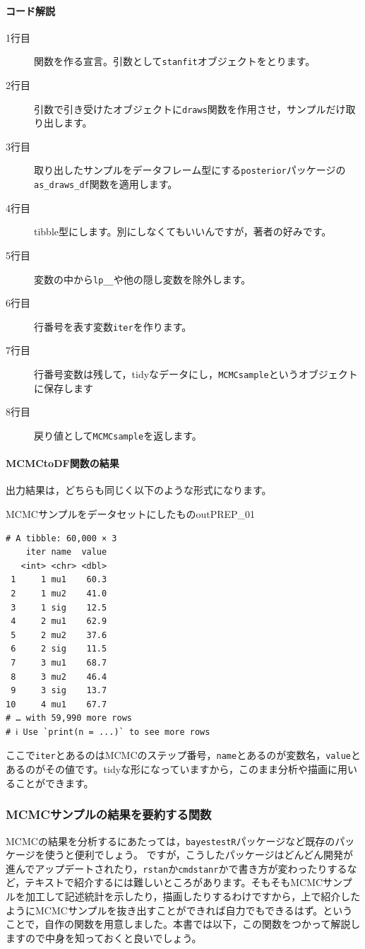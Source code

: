 \documentclass{ltjsbook}
\begin{document}
\paragraph{コード解説}
\begin{description}
	\item[1行目] 関数を作る宣言。引数として\verb|stanfit|オブジェクトをとります。
	\item[2行目] 引数で引き受けたオブジェクトに\verb|draws|関数を作用させ，サンプルだけ取り出します。
	\item[3行目] 取り出したサンプルをデータフレーム型にする\verb|posterior|パッケージの\verb|as_draws_df|関数を適用します。
	\item[4行目] tibble型にします。別にしなくてもいいんですが，著者の好みです。
	\item[5行目] 変数の中から\verb|lp__|や他の隠し変数を除外します。
	\item[6行目] 行番号を表す変数\verb|iter|を作ります。
	\item[7行目] 行番号変数は残して，tidyなデータにし，\verb|MCMCsample|というオブジェクトに保存します
	\item[8行目] 戻り値として\verb|MCMCsample|を返します。
\end{description}


\paragraph{MCMCtoDF関数の結果}
出力結果は，どちらも同じく以下のような形式になります。
\begin{Rscreen}{MCMCサンプルをデータセットにしたもの}{outPREP_01}
	\begin{verbatim}
# A tibble: 60,000 × 3
    iter name  value
   <int> <chr> <dbl>
 1     1 mu1    60.3
 2     1 mu2    41.0
 3     1 sig    12.5
 4     2 mu1    62.9
 5     2 mu2    37.6
 6     2 sig    11.5
 7     3 mu1    68.7
 8     3 mu2    46.4
 9     3 sig    13.7
10     4 mu1    67.7
# … with 59,990 more rows
# ℹ Use `print(n = ...)` to see more rows
  \end{verbatim}
\end{Rscreen}
ここで\verb|iter|とあるのはMCMCのステップ番号，\verb|name|とあるのが変数名，\verb|value|とあるのがその値です。tidyな形になっていますから，このまま分析や描画に用いることができます。

\subsubsection{MCMCサンプルの結果を要約する関数}
MCMCの結果を分析するにあたっては，\verb|bayestestR|パッケージなど既存のパッケージを使うと便利でしょう。
ですが，こうしたパッケージはどんどん開発が進んでアップデートされたり，\verb|rstan|か\verb|cmdstanr|かで書き方が変わったりするなど，テキストで紹介するには難しいところがあります。そもそもMCMCサンプルを加工して記述統計を示したり，描画したりするわけですから，上で紹介したようにMCMCサンプルを抜き出すことができれば自力でもできるはず。ということで，自作の関数を用意しました。本書では以下，この関数をつかって解説しますので中身を知っておくと良いでしょう。
\end{document}
